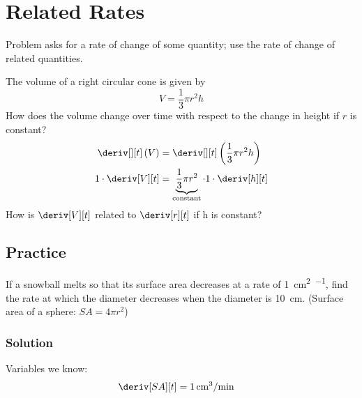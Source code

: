 
\section{Related Rates}
Problem asks for a rate of change of some quantity; use the rate of change of related quantities.
\begin{example}
    The volume of a right circular cone is given by
    \begin{equation*}
        V = \dfrac{1}{3}\pi r^2h
    \end{equation*}
    How does the volume change over time with respect to the change in height if $r$ is constant?
    \begin{align*}
        \deriv[][t]\left(V\right) &= \deriv[][t]\left(\dfrac{1}{3}\pi r^2 h\right) \\
        1 \cdot \deriv[V][t] &= \underbrace{\dfrac{1}{3}\pi r^2}_\text{constant} \cdot 1 \cdot \deriv[h][t]
    \end{align*}
    How is $\deriv[V][t]$ related to $\deriv[r][t]$ if h is constant?

\end{example}
\subsection{Practice}
If a snowball melts so that its surface area decreases at a rate of \SI{1}{\cm\squared\per\min}, find the rate at which the diameter decreases when the diameter is \SI{10}{\cm}. (Surface area of a sphere: $SA = 4\pi r^2$)
\subsubsection{Solution}
Variables we know:
\begin{align*}
    \deriv[SA][t] &= \SI{1}{\cubic\cm\per\min}
\end{align*}
